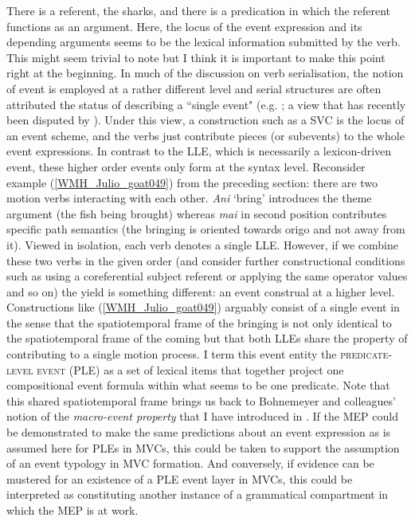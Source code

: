 There is a referent, the sharks, and there is a predication in which the referent functions as an argument. Here, the locus of the event expression and its depending arguments seems to be the lexical information submitted by the verb. This might seem trivial to note but I think it is important to make this point right at the beginning. In much of the discussion on verb serialisation, the notion of event is employed at a rather different level and serial structures are often attributed the status of describing a ``single event" (e.g. \citealt{comrie1995serial, Aikhenvald2006}; a view that has recently been disputed by \citealt{baker2010complex}). Under this view, a construction such as a SVC is the locus of an event scheme, and the verbs just contribute pieces (or subevents) to the whole event expressions. In contrast to the LLE, which is necessarily a lexicon-driven event, these higher order events only form at the syntax level. Reconsider example (\ref{WMH_Julio_goat049}) from the preceding section: there are two motion verbs interacting with each other. \textit{Ani} `bring' introduces the theme argument (the fish being brought) whereas \textit{mai} in second position contributes specific path semantics (the bringing is oriented towards origo and not away from it). Viewed in isolation, each verb denotes a single LLE. However, if we combine these two verbs in the given order (and consider further constructional conditions such as using a coreferential subject referent or applying the same operator values and so on) the yield is something different: an event construal at a higher level. Constructions like (\ref{WMH_Julio_goat049}) arguably consist of a single event in the sense that the spatiotemporal frame of the bringing is not only identical to the spatiotemporal frame of the coming but that both LLEs share the property of contributing to a single motion process. I term this event entity the \textsc{predicate-level event} (PLE) as a set of lexical items that together project one compositional event formula within what seems to be one predicate. Note that this shared spatiotemporal frame brings us back to Bohnemeyer and colleagues' notion of the \textit{macro-event property} that I have introduced in . If the MEP could be demonstrated to make the same predictions about an event expression as is assumed here for PLEs in MVCs, this could be taken to support the assumption of an event typology in MVC formation. And conversely, if evidence can be mustered for an existence of a PLE event layer in MVCs, this could be interpreted as constituting another instance of a grammatical compartment in which the MEP is at work.

